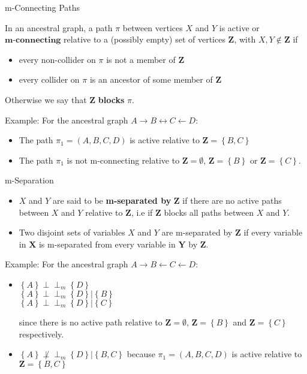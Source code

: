 \documentclass[english, compress, red]{beamer}
\begin{document}
\begin{frame}{m-Connecting Paths}
	\begin{definition}In an ancestral graph, a path $\pi$ between vertices $X$ and $Y$ is active or $\textbf{m-connecting}$ relative to a (possibly empty) set of vertices $\textbf{Z}$, with $X,Y \not \in \mathbf{Z}$ if 
		
		\begin{itemize}
			\item every non-collider on $\pi$ is not a member of $\mathbf{Z}$
			\item every collider on $\pi$ is an ancestor of some member of $\mathbf{Z}$
		\end{itemize}
	Otherwise we say that $\mathbf{Z}$ \textbf{blocks} $\pi$.
	\end{definition}

Example: For the ancestral graph $A \rightarrow B \leftrightarrow C \leftarrow D$:
\begin{itemize}
	\item The path $\pi_1 = (A,B,C,D)$ is active relative to $\mathbf{Z} = \left\{ B,C \right\}$
	\item The path $\pi_1$ is not m-connecting relative to $\mathbf{Z} = \emptyset$, $\mathbf{Z} = \left\{ B \right\}$ or $\mathbf{Z} = \left\{ C\right\}$.
\end{itemize}
\end{frame}

\begin{frame}{m-Separation}
	\begin{definition}
		\begin{itemize}
			\item $X$ and $Y$ are said to be \textbf{m-separated by} $\mathbf{Z}$ if there are no active paths between $X$ and $Y$ relative to $\mathbf{Z}$, i.e if $\mathbf{Z}$ blocks all paths between $X$ and $Y$.
			\item Two disjoint sets of variables $X$ and $Y$ are m-separated by $\mathbf{Z}$ if every variable in $\mathbf{X}$ is m-separated from every variable in $\mathbf{Y}$ by $\mathbf{Z}$.
		\end{itemize}
	\end{definition}
Example: For the ancestral graph $A \rightarrow B \leftarrow C \leftarrow D$:
\begin{itemize}
	\item $\left\{ A\right\} \perp\!\!\!\perp_m \left\{ D \right\}$ \\
	$\left\{ A\right\} \perp\!\!\!\perp_m \left\{ D \right\} | \left\{ B \right\}$ \\
	$\left\{ A\right\} \perp\!\!\!\perp_m \left\{ D \right\} | \left\{ C\right\}$ 
	
	since there is no active path relative to $\mathbf{Z} = \emptyset$, $\mathbf{Z} = \left\{ B \right\}$ and $\mathbf{Z} = \left\{ C \right\}$ respectively.
	
	\item $\left\{ A\right\} \not \perp\!\!\!\perp_m \left\{ D \right\} | \left\{ B, C\right\}$ because $\pi_1 = (A,B,C,D)$ is active relative to $\mathbf{Z} = \left\{ B,C \right\}$
\end{itemize}
\end{frame}
\end{document}
